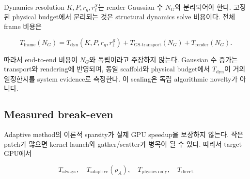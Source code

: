 \documentclass[11pt,a4paper]{article}
\begin{document}
Dynamics resolution \(K,P,r_g,r_\ell^{\mathcal S}\)는 render Gaussian 수 \(N_G\)와 분리되어야 한다.
고정된 physical budget에서 분리되는 것은 structural dynamics solve 비용이다. 전체 frame 비용은

\begin{equation}
  T_{\mathrm{frame}}(N_G)
  =T_{\mathrm{dyn}}(K,P,r_g,r_\ell^{\mathcal S})
  +T_{\mathrm{GS\mbox{-}transport}}(N_G)
  +T_{\mathrm{render}}(N_G).
\end{equation}

따라서 end-to-end 비용이 \(N_G\)와 독립이라고 주장하지 않는다.
Gaussian 수 증가는 transport와 rendering에 반영되며,
동일 scaffold와 physical budget에서 \(T_{\mathrm{dyn}}\)이 거의 일정한지를 system evidence로 측정한다.
이 scaling은 독립 algorithmic novelty가 아니다.

\subsection{Measured break-even}

Adaptive method의 이론적 sparsity가 실제 GPU speedup을 보장하지 않는다.
작은 patch가 많으면 kernel launch와 gather/scatter가 병목이 될 수 있다.
따라서 target GPU에서

\begin{equation}
  T_{\mathrm{always}},\quad
  T_{\mathrm{adaptive}}(\rho_A),\quad
  T_{\mathrm{physics\mbox{-}only}},\quad
  T_{\mathrm{direct}}
\end{equation}
\end{document}
